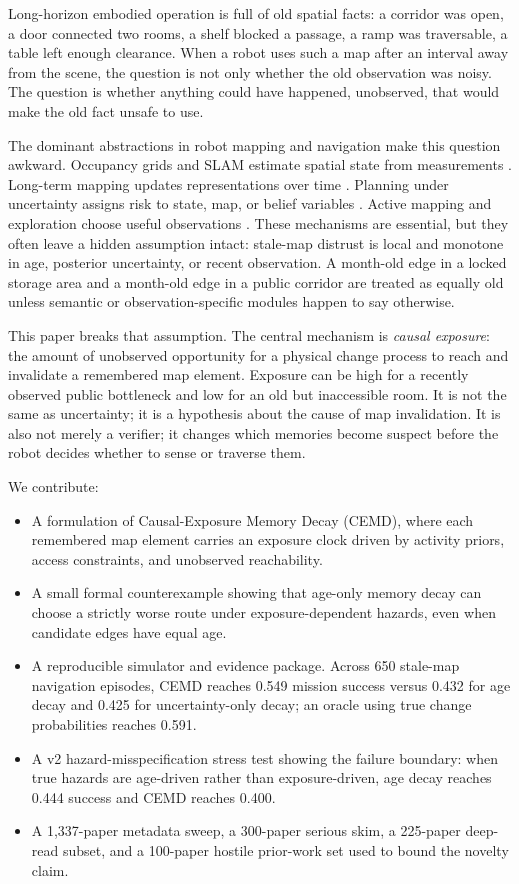 \documentclass{article}
\begin{document}
Long-horizon embodied operation is full of old spatial facts: a corridor was open, a door connected two rooms, a shelf blocked a passage, a ramp was traversable, a table left enough clearance. When a robot uses such a map after an interval away from the scene, the question is not only whether the old observation was noisy. The question is whether anything could have happened, unobserved, that would make the old fact unsafe to use.

The dominant abstractions in robot mapping and navigation make this question awkward. Occupancy grids and SLAM estimate spatial state from measurements \citep{elfes1989occupancy,thrun2005probabilistic,cadena2016slam}. Long-term mapping updates representations over time \citep{biber2005dynamic,churchill2013experience,dayoub2008adaptive}. Planning under uncertainty assigns risk to state, map, or belief variables \citep{prentice2009belief,karkus2017qmdp}. Active mapping and exploration choose useful observations \citep{yamauchi1997frontier,stachniss2005information}. These mechanisms are essential, but they often leave a hidden assumption intact: stale-map distrust is local and monotone in age, posterior uncertainty, or recent observation. A month-old edge in a locked storage area and a month-old edge in a public corridor are treated as equally old unless semantic or observation-specific modules happen to say otherwise.

This paper breaks that assumption. The central mechanism is \emph{causal exposure}: the amount of unobserved opportunity for a physical change process to reach and invalidate a remembered map element. Exposure can be high for a recently observed public bottleneck and low for an old but inaccessible room. It is not the same as uncertainty; it is a hypothesis about the cause of map invalidation. It is also not merely a verifier; it changes which memories become suspect before the robot decides whether to sense or traverse them.

We contribute:
\begin{itemize}
\item A formulation of Causal-Exposure Memory Decay (CEMD), where each remembered map element carries an exposure clock driven by activity priors, access constraints, and unobserved reachability.
\item A small formal counterexample showing that age-only memory decay can choose a strictly worse route under exposure-dependent hazards, even when candidate edges have equal age.
\item A reproducible simulator and evidence package. Across 650 stale-map navigation episodes, CEMD reaches 0.549 mission success versus 0.432 for age decay and 0.425 for uncertainty-only decay; an oracle using true change probabilities reaches 0.591.
\item A v2 hazard-misspecification stress test showing the failure boundary: when true hazards are age-driven rather than exposure-driven, age decay reaches 0.444 success and CEMD reaches 0.400.
\item A 1,337-paper metadata sweep, a 300-paper serious skim, a 225-paper deep-read subset, and a 100-paper hostile prior-work set used to bound the novelty claim.
\end{itemize}
\end{document}
